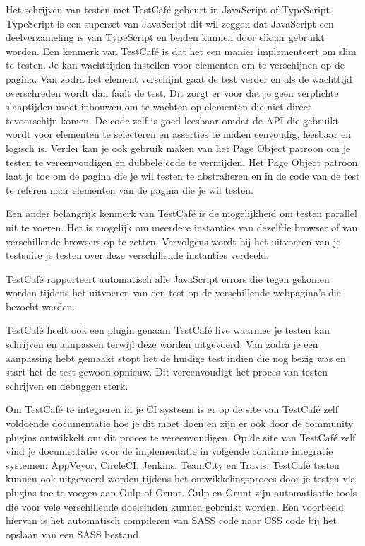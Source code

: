 Het schrijven van testen met TestCafé gebeurt in JavaScript of TypeScript. TypeScript is een superset van JavaScript dit wil zeggen dat JavaScript een deelverzameling is van TypeScript en beiden kunnen door elkaar gebruikt worden. Een kenmerk van TestCafé is dat het een manier implementeert om slim te testen. Je kan wachttijden instellen voor elementen om te verschijnen op de pagina. Van zodra het element verschijnt gaat de test verder en als de wachttijd overschreden wordt dan faalt de test. Dit zorgt er voor dat je geen verplichte slaaptijden moet inbouwen om te wachten op elementen die niet direct tevoorschijn komen. De code zelf is goed leesbaar omdat de API die gebruikt wordt voor elementen te selecteren en asserties te maken eenvoudig, leesbaar en logisch is. Verder kan je ook gebruik maken van het Page Object patroon om je testen te vereenvoudigen en dubbele code te vermijden. Het Page Object patroon laat je toe om de pagina die je wil testen te abstraheren en in de code van de test te referen naar elementen van de pagina die je wil testen. 

Een ander belangrijk kenmerk van TestCafé is de mogelijkheid om testen parallel uit te voeren. Het is mogelijk om meerdere instanties van dezelfde browser of van verschillende browsers op te zetten. Vervolgens wordt bij het uitvoeren van je \gls{testsuite} je testen over deze verschillende instanties verdeeld.

TestCafé rapporteert automatisch alle JavaScript errors die tegen gekomen worden tijdens het uitvoeren van een test op de verschillende webpagina's die bezocht werden. 

TestCafé heeft ook een plugin genaam TestCafé live waarmee je testen kan schrijven en aanpassen terwijl deze worden uitgevoerd. Van zodra je een aanpassing hebt gemaakt stopt het de huidige test indien die nog bezig was en start het de test gewoon opnieuw. Dit vereenvoudigt het proces van testen schrijven en debuggen sterk. 

Om TestCafé te integreren in je \gls{CI} systeem is er op de site van TestCafé zelf voldoende documentatie hoe je dit moet doen en zijn er ook door de community plugins ontwikkelt om dit proces te vereenvoudigen. Op de site van TestCafé zelf vind je documentatie voor de implementatie in volgende continue integratie systemen: AppVeyor, CircleCI, Jenkins, TeamCity en Travis. TestCafé testen kunnen ook uitgevoerd worden tijdens het ontwikkelingsproces door je testen via plugins toe te voegen aan Gulp of Grunt. Gulp en Grunt zijn automatisatie tools die voor vele verschillende doeleinden kunnen gebruikt worden. Een voorbeeld hiervan is het automatisch compileren van SASS code naar CSS code bij het opslaan van een SASS bestand.
